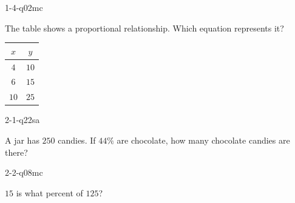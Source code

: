 
\begin{practiceQuestion}{1-4-q02}{mc}
\begin{questionText}
The table shows a proportional relationship. Which equation represents it?

\begin{center}
\begin{tabular}{|c|c|}
\hline $x$ & $y$ \\ \hline $4$ & $10$ \\ $6$ & $15$ \\ $10$ & $25$ \\ \hline
\end{tabular}
\end{center}
\end{questionText}
\end{practiceQuestion}

\begin{practiceQuestion}{2-1-q22}{sa}
\begin{questionText}
A jar has $250$ candies. If $44\%$ are chocolate, how many chocolate candies are there?
\end{questionText}
\end{practiceQuestion}

\begin{practiceQuestion}{2-2-q08}{mc}
\begin{questionText}
$15$ is what percent of $125$?
\end{questionText}
\end{practiceQuestion}

